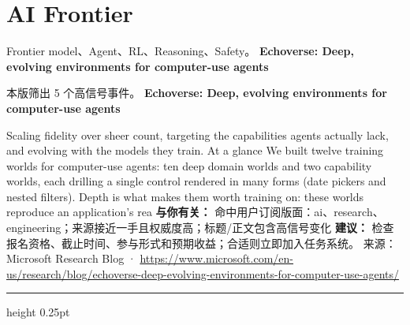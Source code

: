 \documentclass[10.5pt]{ctexart}
\begin{document}
\section*{AI Frontier}
{\color{ormuted} Frontier model、Agent、RL、Reasoning、Safety。}
\vspace{2mm}
{\LARGE\bfseries Echoverse: Deep, evolving environments for computer-use agents}\par
\vspace{1mm}
{\color{ormuted} 本版筛出 5 个高信号事件。}
\vspace{3mm}
{\Large\bfseries Echoverse: Deep, evolving environments for computer-use agents}\par
Scaling fidelity over sheer count, targeting the capabilities agents actually lack, and evolving with the models they train. At a glance We built twelve training worlds for computer-use agents: ten deep domain worlds and two capability worlds, each drilling a single control rendered in many forms (date pickers and nested filters). Depth is what makes them worth training on: these worlds reproduce an application’s rea
\textbf{与你有关：} 命中用户订阅版面：ai、research、engineering；来源接近一手且权威度高；标题/正文包含高信号变化
\textbf{建议：} 检查报名资格、截止时间、参与形式和预期收益；合适则立即加入任务系统。
{\footnotesize\color{ormuted} 来源：Microsoft Research Blog · \url{https://www.microsoft.com/en-us/research/blog/echoverse-deep-evolving-environments-for-computer-use-agents/}}
\vspace{4mm}
\hrule height 0.25pt
\vspace{3mm}
\end{document}
